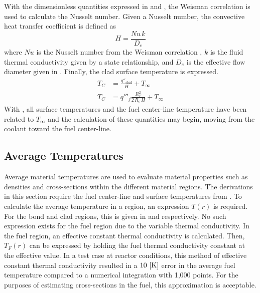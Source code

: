       With the dimensionless quantities expressed in  and
      , the Weisman correlation is used to calculate the Nusselt
      number. Given a Nusselt number, the convective heat transfer coefficient
      is defined as
      \begin{equation}
        \label{eq:hc}
        H = \frac{Nu \, k}{D_e}
      \end{equation}
      where $Nu$ is the Nusselt number from the Weisman correlation
      , $k$ is the fluid thermal conductivity given by a state
      relationship, and $D_e$ is the effective flow diameter given in
      . Finally, the clad surface temperature is expressed.
      \begin{align}
        T_C &= \frac{q''_{clad}}{H} + T_{\infty} \\
        \label{eq:tc}
        T_C &= q'''_j \frac{R_F^2}{2\,R_c\,H} + T_{\infty}
      \end{align}
      With , all surface temperatures and the fuel center-line
      temperature have been related to $T_{\infty}$ and the calculation of these
      quantities may begin, moving from the coolant toward the fuel center-line.

  \subsection{Average Temperatures}
    \label{sec:average_temps}
    Average material temperatures are used to evaluate material properties such
    as densities and cross-sections within the different material regions. The
    derivations in this section require the fuel center-line and surface
    temperatures from . To calculate the average
    temperature in a region, an expression $T(r)$ is required. For the bond and
    clad regions, this is given in  and  respectively.
    No such expression exists for the fuel region due to the variable thermal
    conductivity. In the fuel region, an effective constant thermal conductivity
    is calculated. Then, $T_F(r)$ can be expressed by holding the fuel thermal
    conductivity constant at the effective value. In a test case at reactor
    conditions, this method of effective constant thermal conductivity resulted
    in a $10 \,\left[\text{{K}}\right]$ error in the average fuel temperature compared to a
    numerical integration with 1,000 points. For the purposes of estimating
    cross-sections in the fuel, this approximation is acceptable.


